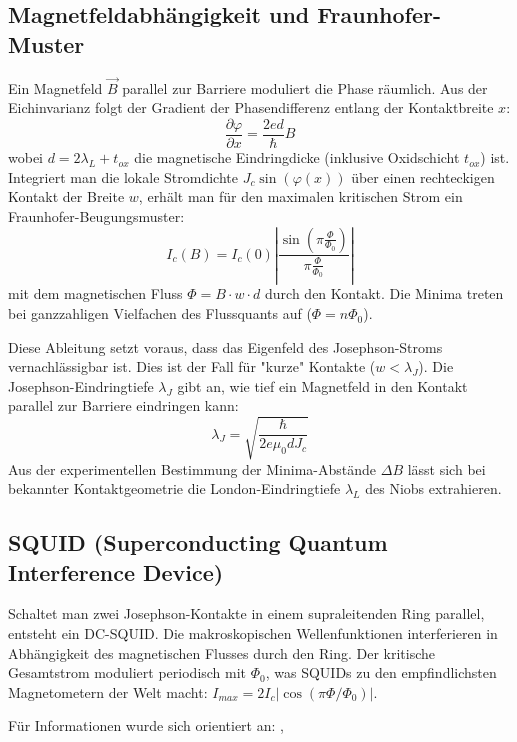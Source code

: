 

\subsection{Magnetfeldabhängigkeit und Fraunhofer-Muster}
Ein Magnetfeld $\vec{B}$ parallel zur Barriere moduliert die Phase räumlich. Aus der Eichinvarianz folgt der Gradient der Phasendifferenz entlang der Kontaktbreite $x$:
\begin{equation}
    \frac{\partial \varphi}{\partial x} = \frac{2e d}{\hbar} B
\end{equation}
wobei $d = 2\lambda_L + t_{ox}$ die magnetische Eindringdicke (inklusive Oxidschicht $t_{ox}$) ist. Integriert man die lokale Stromdichte $J_c \sin(\varphi(x))$ über einen rechteckigen Kontakt der Breite $w$, erhält man für den maximalen kritischen Strom ein Fraunhofer-Beugungsmuster:
\begin{equation}
    I_c(B) = I_c(0) \left| \frac{\sin\left(\pi \frac{\Phi}{\Phi_0}\right)}{\pi \frac{\Phi}{\Phi_0}} \right|
    \label{eq:fraunhofer}
\end{equation}
mit dem magnetischen Fluss $\Phi = B \cdot w \cdot d$ durch den Kontakt. Die Minima treten bei ganzzahligen Vielfachen des Flussquants auf ($\Phi = n\Phi_0$). 

Diese Ableitung setzt voraus, dass das Eigenfeld des Josephson-Stroms vernachlässigbar ist. Dies ist der Fall für "kurze" Kontakte ($w < \lambda_J$). Die Josephson-Eindringtiefe $\lambda_J$ gibt an, wie tief ein Magnetfeld in den Kontakt parallel zur Barriere eindringen kann:
\begin{equation}
    \lambda_J = \sqrt{\frac{\hbar}{2e \mu_0 d J_c}}
\end{equation}
Aus der experimentellen Bestimmung der Minima-Abstände $\Delta B$ lässt sich bei bekannter Kontaktgeometrie die London-Eindringtiefe $\lambda_L$ des Niobs extrahieren.

\subsection{SQUID (Superconducting Quantum Interference Device)}
Schaltet man zwei Josephson-Kontakte in einem supraleitenden Ring parallel, entsteht ein DC-SQUID. Die makroskopischen Wellenfunktionen interferieren in Abhängigkeit des magnetischen Flusses durch den Ring. Der kritische Gesamtstrom moduliert periodisch mit $\Phi_0$, was SQUIDs zu den empfindlichsten Magnetometern der Welt macht: $I_{max} = 2I_c |\cos(\pi \Phi / \Phi_0)|$.

Für Informationen wurde sich orientiert an: \cite{NicoLang}, \cite{Thesis}